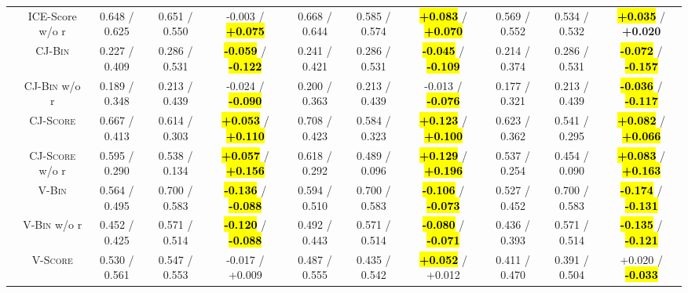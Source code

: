 \begin{table}[t]
\begin{tabular}{@{}c|c|ccc|ccc|ccc@{}}
                    & ICE-Score w/o r         & 0.648 / 0.625   & 0.651 / 0.550   & -0.003 / \hl{\textbf{+0.075}}               & 0.668 / 0.644   & 0.585 / 0.574   & \hl{\textbf{+0.083}} / \hl{\textbf{+0.070}} & 0.569 / 0.552   & 0.534 / 0.532   & \hl{\textbf{+0.035}} / \textbf{+0.020}      \\
        \cmidrule{2-11}
                    & \textsc{CJ-Bin}         & 0.227 / 0.409   & 0.286 / 0.531   & \hl{\textbf{-0.059}} / \hl{\textbf{-0.122}} & 0.241 / 0.421   & 0.286 / 0.531   & \hl{\textbf{-0.045}} / \hl{\textbf{-0.109}} & 0.214 / 0.374   & 0.286 / 0.531   & \hl{\textbf{-0.072}} / \hl{\textbf{-0.157}} \\
                    & \textsc{CJ-Bin} w/o r   & 0.189 / 0.348   & 0.213 / 0.439   & -0.024 / \hl{\textbf{-0.090}}               & 0.200 / 0.363   & 0.213 / 0.439   & -0.013 / \hl{\textbf{-0.076}}               & 0.177 / 0.321   & 0.213 / 0.439   & \hl{\textbf{-0.036}} / \hl{\textbf{-0.117}} \\
                    & \textsc{CJ-Score}       & 0.667 / 0.413   & 0.614 / 0.303   & \hl{\textbf{+0.053}} / \hl{\textbf{+0.110}} & 0.708 / 0.423   & 0.584 / 0.323   & \hl{\textbf{+0.123}} / \hl{\textbf{+0.100}} & 0.623 / 0.362   & 0.541 / 0.295   & \hl{\textbf{+0.082}} / \hl{\textbf{+0.066}} \\
                    & \textsc{CJ-Score} w/o r & 0.595 / 0.290   & 0.538 / 0.134   & \hl{\textbf{+0.057}} / \hl{\textbf{+0.156}} & 0.618 / 0.292   & 0.489 / 0.096   & \hl{\textbf{+0.129}} / \hl{\textbf{+0.196}} & 0.537 / 0.254   & 0.454 / 0.090   & \hl{\textbf{+0.083}} / \hl{\textbf{+0.163}} \\
        \cmidrule{2-11}
                    & \textsc{V-Bin}          & 0.564 / 0.495   & 0.700 / 0.583   & \hl{\textbf{-0.136}} / \hl{\textbf{-0.088}} & 0.594 / 0.510   & 0.700 / 0.583   & \hl{\textbf{-0.106}} / \hl{\textbf{-0.073}} & 0.527 / 0.452   & 0.700 / 0.583   & \hl{\textbf{-0.174}} / \hl{\textbf{-0.131}} \\
                    & \textsc{V-Bin} w/o r    & 0.452 / 0.425   & 0.571 / 0.514   & \hl{\textbf{-0.120}} / \hl{\textbf{-0.088}} & 0.492 / 0.443   & 0.571 / 0.514   & \hl{\textbf{-0.080}} / \hl{\textbf{-0.071}} & 0.436 / 0.393   & 0.571 / 0.514   & \hl{\textbf{-0.135}} / \hl{\textbf{-0.121}} \\
                    & \textsc{V-Score}        & 0.530 / 0.561   & 0.547 / 0.553   & -0.017 / +0.009                             & 0.487 / 0.555   & 0.435 / 0.542   & \hl{\textbf{+0.052}} / +0.012               & 0.411 / 0.470   & 0.391 / 0.504   & +0.020 / \hl{\textbf{-0.033}}               \\

\end{tabular}
\end{table}
